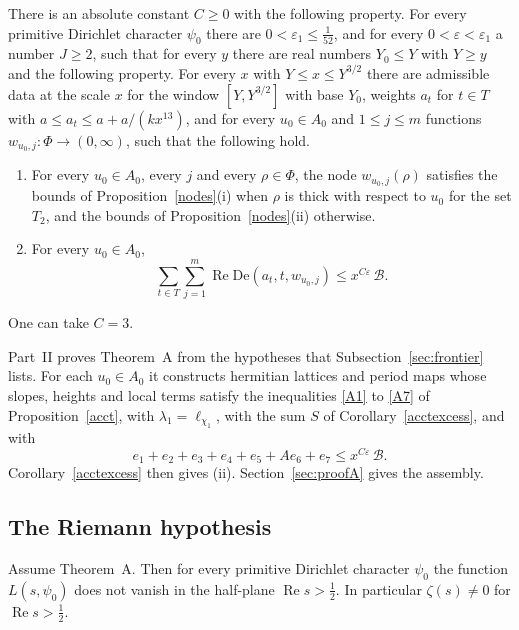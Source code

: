 \begin{theoremA}
There is an absolute constant $C\ge0$ with the following property. For every primitive Dirichlet character $\psi_0$ there are $0<\varepsilon_1\le\frac1{52}$, and for every $0<\varepsilon<\varepsilon_1$ a number $J\ge2$, such that for every $y$ there are real numbers $Y_0\le Y$ with $Y\ge y$ and the following property. For every $x$ with $Y\le x\le Y^{3/2}$ there are admissible data at the scale $x$ for the window $[Y,Y^{3/2}]$ with base $Y_0$, weights $a_t$ for $t\in T$ with $a\le a_t\le a+a/(kx^{13})$, and for every $u_0\in A_0$ and $1\le j\le m$ functions $w_{u_0,j}\colon\Phi\to(0,\infty)$, such that the following hold.
\begin{enumerate}
\item[(i)] For every $u_0\in A_0$, every $j$ and every $\rho\in\Phi$, the node $w_{u_0,j}(\rho)$ satisfies the bounds of Proposition~\ref{nodes}(i) when $\rho$ is thick with respect to $u_0$ for the set $T_2$, and the bounds of Proposition~\ref{nodes}(ii) otherwise.
\item[(ii)] For every $u_0\in A_0$,
\[
\sum_{t\in T}\sum_{j=1}^m\operatorname{Re}\mathrm{De}(a_t,t,w_{u_0,j})\le x^{C\varepsilon}\,\mathcal B .
\]
\end{enumerate}
One can take $C=3$.
\end{theoremA}

Part~II proves Theorem~A from the hypotheses that Subsection~\ref{sec:frontier} lists. For each $u_0\in A_0$ it constructs hermitian lattices and period maps whose slopes, heights and local terms satisfy the inequalities \eqref{A1} to \eqref{A7} of Proposition~\ref{acct}, with $\lambda_1=\ell_{\chi_1}$, with the sum $S$ of Corollary~\ref{acctexcess}, and with
\[
e_1+e_2+e_3+e_4+e_5+Ae_6+e_7\le x^{C\varepsilon}\,\mathcal B .
\]
Corollary~\ref{acctexcess} then gives (ii). Section~\ref{sec:proofA} gives the assembly.

\subsection{The Riemann hypothesis}

\begin{theorem}\label{mainthm}
Assume Theorem~A. Then for every primitive Dirichlet character $\psi_0$ the function $L(s,\psi_0)$ does not vanish in the half-plane $\operatorname{Re}s>\frac12$. In particular $\zeta(s)\ne0$ for $\operatorname{Re}s>\frac12$.
\end{theorem}

